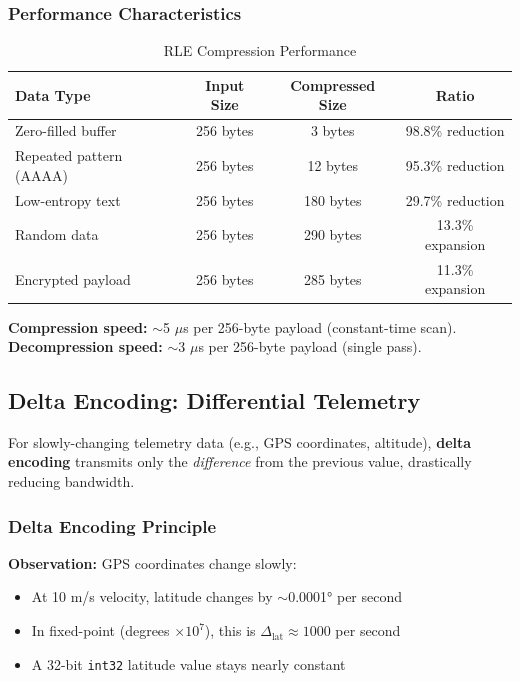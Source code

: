 \documentclass[11pt,a4paper]{article}
\begin{document}
\subsubsection{Performance Characteristics}

\begin{table}[H]
\centering
\begin{tabular}{@{}lccc@{}}
\toprule
\textbf{Data Type} & \textbf{Input Size} & \textbf{Compressed Size} & \textbf{Ratio} \\
\midrule
Zero-filled buffer      & 256 bytes & 3 bytes   & 98.8\% reduction \\
Repeated pattern (AAAA) & 256 bytes & 12 bytes  & 95.3\% reduction \\
Low-entropy text        & 256 bytes & 180 bytes & 29.7\% reduction \\
Random data             & 256 bytes & 290 bytes & 13.3\% expansion \\
Encrypted payload       & 256 bytes & 285 bytes & 11.3\% expansion \\
\bottomrule
\end{tabular}
\caption{RLE Compression Performance}
\end{table}

\textbf{Compression speed:} $\sim$5 $\mu$s per 256-byte payload (constant-time scan). \\
\textbf{Decompression speed:} $\sim$3 $\mu$s per 256-byte payload (single pass).

\subsection{Delta Encoding: Differential Telemetry}

For slowly-changing telemetry data (e.g., GPS coordinates, altitude), \textbf{delta encoding} transmits only the \emph{difference} from the previous value, drastically reducing bandwidth.

\subsubsection{Delta Encoding Principle}

\textbf{Observation:} GPS coordinates change slowly:
\begin{itemize}[noitemsep]
    \item At 10 m/s velocity, latitude changes by $\sim$0.0001° per second
    \item In fixed-point (degrees $\times 10^7$), this is $\Delta_{\text{lat}} \approx 1000$ per second
    \item A 32-bit \texttt{int32} latitude value stays nearly constant
\end{itemize}
\end{document}
